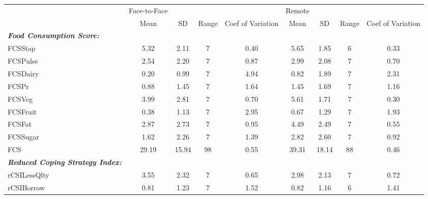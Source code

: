 {
\def\sym#1{\ifmmode^{#1}\else\(^{#1}\)\fi}
\begin{tabular}{l*{2}{cccc}}
\hline\hline
            &Face-to-Face&            &            &            &      Remote&            &            &            \\
            &        Mean&          SD&       Range&Coef of Variation&        Mean&          SD&       Range&Coef of Variation\\
\hline
      \textbf{\textit{Food Consumption Score:}}&            &            &            &            &            &            &            &            \\
FCSStap     &        5.32&        2.11&           7&        0.40&        5.65&        1.85&           6&        0.33\\
FCSPulse    &        2.54&        2.20&           7&        0.87&        2.99&        2.08&           7&        0.70\\
FCSDairy    &        0.20&        0.99&           7&        4.94&        0.82&        1.89&           7&        2.31\\
FCSPr       &        0.88&        1.45&           7&        1.64&        1.45&        1.69&           7&        1.16\\
FCSVeg      &        3.99&        2.81&           7&        0.70&        5.61&        1.71&           7&        0.30\\
FCSFruit    &        0.38&        1.13&           7&        2.95&        0.67&        1.29&           7&        1.93\\
FCSFat      &        2.87&        2.73&           7&        0.95&        4.49&        2.49&           7&        0.55\\
FCSSugar    &        1.62&        2.26&           7&        1.39&        2.82&        2.60&           7&        0.92\\
FCS         &       29.19&       15.94&          98&        0.55&       39.31&       18.14&          88&        0.46\\
      \textbf{\textit{Reduced Coping Strategy Index:}}&            &            &            &            &            &            &            &            \\
rCSILessQlty&        3.55&        2.32&           7&        0.65&        2.98&        2.13&           7&        0.72\\
rCSIBorrow  &        0.81&        1.23&           7&        1.52&        0.82&        1.16&           6&        1.41\\

\end{tabular}}
